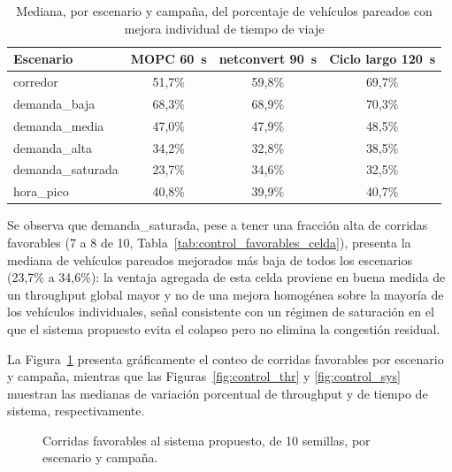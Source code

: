 \begin{table}[htbp]
\renewcommand{\arraystretch}{1.3}
\caption{Mediana, por escenario y campaña, del porcentaje de vehículos pareados con
mejora individual de tiempo de viaje}
\label{tab:control_pareado_celda}
\centering
\footnotesize
\begin{tabular}{lccc}
\hline
\textbf{Escenario} & \textbf{MOPC 60~s} & \textbf{netconvert 90~s} & \textbf{Ciclo largo 120~s} \\
\hline
corredor          & 51,7\% & 59,8\% & 69,7\% \\
demanda\_baja      & 68,3\% & 68,9\% & 70,3\% \\
demanda\_media     & 47,0\% & 47,9\% & 48,5\% \\
demanda\_alta      & 34,2\% & 32,8\% & 38,5\% \\
demanda\_saturada  & 23,7\% & 34,6\% & 32,5\% \\
hora\_pico         & 40,8\% & 39,9\% & 40,7\% \\
\hline
\end{tabular}
\end{table}

Se observa que demanda\_saturada, pese a tener una fracción alta de corridas favorables
(7 a 8 de 10, Tabla~\ref{tab:control_favorables_celda}), presenta la mediana de vehículos
pareados mejorados más baja de todos los escenarios (23,7\% a 34,6\%): la ventaja agregada de esta
celda proviene en buena medida de un throughput global mayor y no de una mejora
homogénea sobre la mayoría de los vehículos individuales, señal consistente con un
régimen de saturación en el que el sistema propuesto evita el colapso pero no elimina la
congestión residual.

La Figura~\ref{fig:control_favorables} presenta gráficamente el conteo de corridas
favorables por escenario y campaña, mientras que las Figuras~\ref{fig:control_thr} y
\ref{fig:control_sys} muestran las medianas de variación porcentual de throughput y de
tiempo de sistema, respectivamente.

\begin{figure}[htbp]
\centering
{}
\caption{Corridas favorables al sistema propuesto, de 10 semillas, por escenario y campaña.}
\label{fig:control_favorables}
\end{figure}

